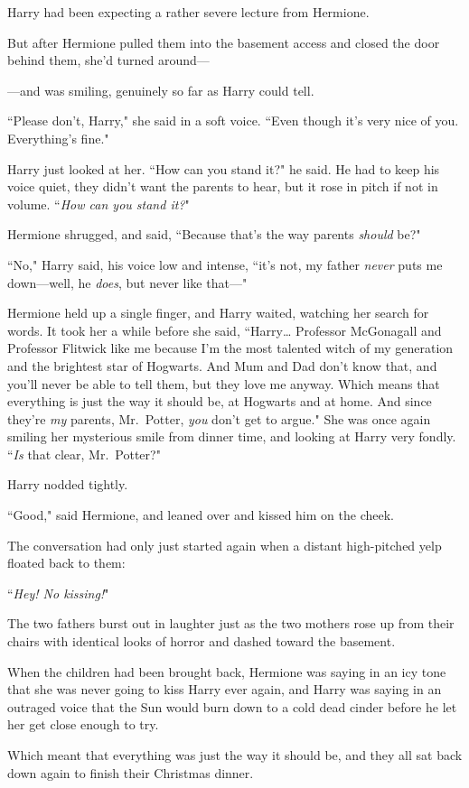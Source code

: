 Harry had been expecting a rather severe lecture from Hermione.

But after Hermione pulled them into the basement access and closed the door behind them, she'd turned around—

—and was smiling, genuinely so far as Harry could tell.

``Please don't, Harry," she said in a soft voice. ``Even though it's very nice of you. Everything's fine."

Harry just looked at her. ``How can you stand it?" he said. He had to keep his voice quiet, they didn't want the parents to hear, but it rose in pitch if not in volume. ``\emph{How can you stand it?}"

Hermione shrugged, and said, ``Because that's the way parents \emph{should} be?"

``No," Harry said, his voice low and intense, ``it's not, my father \emph{never} puts me down—well, he \emph{does}, but never like that—"

Hermione held up a single finger, and Harry waited, watching her search for words. It took her a while before she said, ``Harry{\ldots} Professor McGonagall and Professor Flitwick like me because I'm the most talented witch of my generation and the brightest star of Hogwarts. And Mum and Dad don't know that, and you'll never be able to tell them, but they love me anyway. Which means that everything is just the way it should be, at Hogwarts and at home. And since they're \emph{my} parents, Mr.~Potter, \emph{you} don't get to argue." She was once again smiling her mysterious smile from dinner time, and looking at Harry very fondly. ``\emph{Is} that clear, Mr.~Potter?"

Harry nodded tightly.

``Good," said Hermione, and leaned over and kissed him on the cheek.

\later

The conversation had only just started again when a distant high-pitched yelp floated back to them:

``\emph{Hey! No kissing!}"

The two fathers burst out in laughter just as the two mothers rose up from their chairs with identical looks of horror and dashed toward the basement.

When the children had been brought back, Hermione was saying in an icy tone that she was never going to kiss Harry ever again, and Harry was saying in an outraged voice that the Sun would burn down to a cold dead cinder before he let her get close enough to try.

Which meant that everything was just the way it should be, and they all sat back down again to finish their Christmas dinner.

